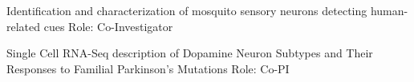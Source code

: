 \documentclass{nihbiosketch}
\begin{document}

{Identification and characterization of mosquito sensory neurons detecting human-related cues }
{Role: Co-Investigator}


{Single Cell RNA-Seq description of Dopamine Neuron Subtypes and Their Responses to Familial Parkinson’s Mutations}
{Role: Co-PI}







\end{document}
